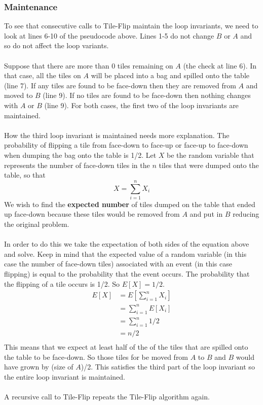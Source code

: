 \documentclass[12pt]{article}
\begin{document}
\subsubsection*{Maintenance}
To see that consecutive calls to Tile-Flip maintain the loop invariants, we need to look at lines 6-10 of the pseudocode above.  Lines 1-5 do not change $B$ or $A$ and so do not affect the loop variants.\\
\\
Suppose that there are more than 0 tiles remaining on $A$ (the check at line 6).  In that case, all the tiles on $A$ will be placed into a bag and spilled onto the table (line 7).  If any tiles are found to be face-down then they are removed from $A$ and moved to $B$ (line 9).  If no tiles are found to be face-down then nothing changes with $A$ or $B$ (line 9).  For both cases, the first two of the loop invariants are maintained. \\
\\
How the third loop invariant is maintained needs more explanation.  The probability of flipping a tile from face-down to face-up or face-up to face-down when dumping the bag onto the table is 1/2.  Let $X$ be the random variable that represents the number of face-down tiles in the $n$ tiles that were dumped onto the table, so that 
$$
X = \sum_{i=1}^{n} X_i
$$
We wish to find the \textbf{expected number} of tiles dumped on the table that ended up face-down because these tiles would be removed from $A$ and put in $B$ reducing the original problem.\\
\\
In order to do this we take the expectation of both sides of the equation above and solve.
Keep in mind that the expected value of a random variable (in this case the number of face-down tiles) associated with an event (in this case flipping) is equal to the probability that the event occurs.  The probability that the flipping of a tile occurs is 1/2. So $E[X] = 1/2$.
\begin{align*}
E[X]  &= E[\sum_{i=1}^{n} X_i]\\
	&= \sum_{i=1}^{n} E[X_i]\\
	&= \sum_{i=1}^{n} 1/2\\ 
	&=n/2\\
\end{align*}
\noindent
This means that we expect at least half of the of the tiles that are spilled onto the table to be face-down.  So those tiles for be moved from $A$ to $B$ and $B$ would have grown by (size of $A$)/2.  This satisfies the third part of the loop invariant so the entire loop invariant is maintained.\\
\\
A recursive call to Tile-Flip repeats the Tile-Flip algorithm again.\\   
\end{document}

